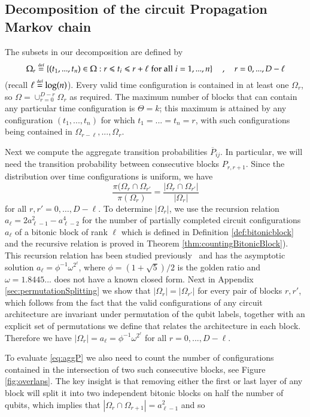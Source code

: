 \documentclass[11pt,letterpaper]{article}
\theoremstyle{definition}
\theoremstyle{remark}
\newcommand{\defeq}{\stackrel{\mbox{\normalfont\tiny def}}=}
\renewcommand{\leq}{\leqslant}
\numberwithin{equation}{section}
\theoremstyle{definition}
\begin{document}
\subsection{Decomposition of the circuit Propagation Markov chain}
The subsets in our decomposition are defined by
\begin{equation}
\Omega_r \defeq \left \{ (t_1,...,t_n) \in \Omega :  r \leq t_i \leq r + \ell \; \textrm{for all} \; i = 1,...,n\right\}  \quad , \quad r = 0, ... , D - \ell
\end{equation}
(recall $\ell \defeq \log(n)$).  Every valid time configuration is contained in at least one $\Omega_r$, so $\Omega = \cup_{r = 0}^{D - r} \Omega_r$ as required.  The maximum number of blocks that can contain any particular time configuration is $\Theta = k$; this maximum is attained by any configuration $(t_1,...,t_n)$ for which $t_1 = ... = t_n = r$, with such configurations being contained in $\Omega_{r - \ell} ,... , \Omega_{r}$. 

Next we compute the aggregate transition probabilities $\overline{P}_{ij}$.  In particular, we will need the transition probability between consecutive blocks $P_{r,r+1}$.  Since the distribution over time configurations is uniform, we have
$$
\frac{\pi(\Omega_r \cap \Omega_{r'}}{\pi(\Omega_r)} = \frac{|\Omega_r \cap \Omega_{r'}|}{|\Omega_r|}
$$
for all $r,r' = 0,\ldots, D - \ell$.  To determine $|\Omega_r|$, we use the recursion relation $a_\ell = 2 a^2_{\ell -1} - a^4_{\ell -2}$ for the number of partially completed circuit configurations $a_\ell$ of a bitonic block of rank $\ell$ which is defined in Definition \ref{def:bitonicblock} and the recursive relation is proved in Theorem \ref{thm:countingBitonicBlock}).  This recursion relation has been studied previously~\cite{lagarias2002counting} and has the asymptotic solution $a_\ell = \phi^{-1} \omega^{2^\ell}$, where $\phi = (1 + \sqrt{5})/2$ is the golden ratio and $\omega = 1.8445...$ does not have a known closed form. Next in Appendix \ref{sec:permutationSplitting} we show that $|\Omega_r| = |\Omega_{r'}|$ for every pair of blocks $r,r'$, which follows from the fact that the valid configurations of any circuit architecture are invariant under permutation of the qubit labels, together with an explicit set of permutations we define that relates the architecture in each block.  Therefore we have $|\Omega_r| = a_{\ell} = \phi^{-1} \omega^{2^\ell}$ for all $r = 0,...,D - \ell$.

To evaluate \eqref{eq:aggP} we also need to count the number of configurations contained in the intersection of two such consecutive blocks, see Figure \ref{fig:overlaps}.  The key insight is that removing either the first or last layer of any block will split it into two independent bitonic blocks on half the number of qubits, which implies that $|\Omega_r \cap \Omega_{r+1}| = a^2_{\ell-1}$ and so
\end{document}
